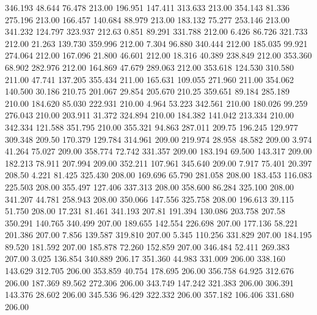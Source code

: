  346.193   48.644   76.478       213.00
 196.951  147.411  313.633       213.00
 354.143   81.336  275.196       213.00
 166.457  140.684   88.979       213.00
 183.132   75.277  253.146       213.00
 341.232  124.797  323.937       212.63
   0.851   89.291  331.788       212.00
   6.426   86.726  321.733       212.00
  21.263  139.730  359.996       212.00
   7.304   96.880  340.444       212.00
 185.035   99.921  274.064       212.00
 167.096   21.800   46.601       212.00
  18.316   40.389  238.849       212.00
 353.360   68.902  282.976       212.00
 164.869   47.679  289.063       212.00
 353.618  124.530  310.580       211.00
  47.741  137.205  355.434       211.00
 165.631  109.055  271.960       211.00
 354.062  140.500   30.186       210.75
 201.067   29.854  205.670       210.25
 359.651   89.184  285.189       210.00
 184.620   85.030  222.931       210.00
   4.964   53.223  342.561       210.00
 180.026   99.259  276.043       210.00
 203.911   31.372  324.894       210.00
 184.382  141.042  213.334       210.00
 342.334  121.588  351.795       210.00
 355.321   94.863  287.011       209.75
 196.245  129.977  309.348       209.50
 170.379  129.784  314.961       209.00
 219.974   28.958   48.582       209.00
   3.974   41.264   75.027       209.00
 358.774   72.742  331.357       209.00
 183.194   69.500  143.317       209.00
 182.213   78.911  207.994       209.00
 352.211  107.961  345.640       209.00
   7.917   75.401   20.397       208.50
   4.221   81.425  325.430       208.00
 169.696   65.790  281.058       208.00
 183.453  116.083  225.503       208.00
 355.497  127.406  337.313       208.00
 358.600   86.284  325.100       208.00
 341.207   44.781  258.943       208.00
 350.066  147.556  325.758       208.00
 196.613   39.115   51.750       208.00
  17.231   81.461  341.193       207.81
 191.394  130.086  203.758       207.58
 350.291  140.765  340.499       207.00
 189.655  142.554  226.698       207.00
 177.136   58.221  201.386       207.00
   7.856  139.587  319.810       207.00
   5.345  110.256  331.829       207.00
 184.195   89.520  181.592       207.00
 185.878   72.260  152.859       207.00
 346.484   52.411  269.383       207.00
   3.025  136.854  340.889       206.17
 351.360   44.983  331.009       206.00
 338.160  143.629  312.705       206.00
 353.859   40.754  178.695       206.00
 356.758   64.925  312.676       206.00
 187.369   89.562  272.306       206.00
 343.749  147.242  321.383       206.00
 306.391  143.376   28.602       206.00
 345.536   96.429  322.332       206.00
 357.182  106.406  331.680       206.00
